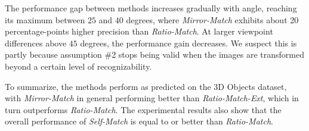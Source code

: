 \documentclass[review]{elsarticle}
\begin{document}
The performance gap between methods increases gradually with angle, reaching its maximum between $25$ and $40$ degrees, where \emph{Mirror-Match} exhibits about 20 percentage-points higher precision than \emph{Ratio-Match}. At larger viewpoint differences above $45$ degrees, the performance gain decreases.  We suspect this is partly because assumption \#2 stops being valid when the images are transformed beyond a certain level of recognizability.

To summarize, the methods perform as predicted on the 3D Objects dataset, with \emph{Mirror-Match} in general performing better than \emph{Ratio-Match-Ext}, which in turn outperforms \emph{Ratio-Match}. The experimental results also show that the overall performance of \emph{Self-Match} is equal to or better than \emph{Ratio-Match}.
\end{document}
